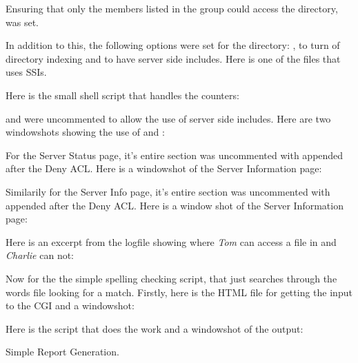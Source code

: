 \subitemscont Ensuring that only the members listed in the  group could access the directory,  was set.

\subitemscont In addition to this, the following options were set for the directory: , to turn of directory indexing and  to have server side includes. Here is one of the  files that uses SSIs.


\subitemscont Here is the small shell script that handles the counters:


\subitems {} and  were uncommented to allow the use of server side includes. Here are two windowshots showing the use of  and :

\subitemscont{}

\subitemscont{}

\subitems For the Server Status page, it's entire  section was uncommented with  appended after the Deny ACL. Here is a windowshot of the Server Information page:

\subitemscont{}

\subitems Similarily for the Server Info page, it's entire  section was uncommented with  appended after the Deny ACL. Here is a window shot of the Server Information page:

\subitemscont{}

\subitems Here is an excerpt from the logfile showing where {\it Tom\/} can access a file in  and {\it Charlie\/} can not:


\subitems Now for the the simple spelling checking script, that just searches through the words file looking for a match. Firstly, here is the HTML file for getting the input to the CGI and a windowshot:


\subitemscont{}

\subitemscont Here is the  script that does the work and a windowshot of the output:


\subitemscont{}


\items Simple Report Generation.


\bye
